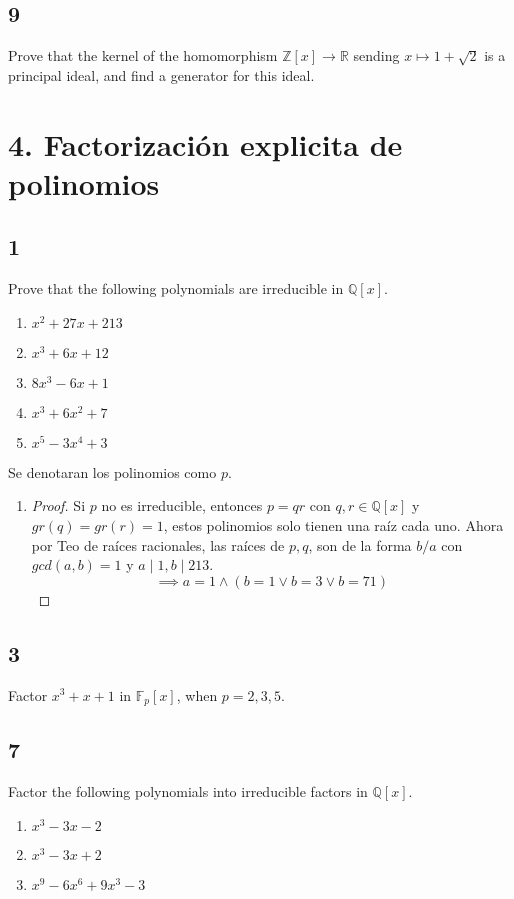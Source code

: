 \documentclass[11pt]{article}
\newcommand{\set}[1]{\mathbb{#1}}
\theoremstyle{definition}
\begin{document}
    \subsection{9}
    Prove that the kernel of the homomorphism $\set{Z}[x]\rightarrow \set{R}$ sending $x\mapsto 1+\sqrt{2}$ is a principal ideal, and find a generator for this ideal.

    \section{4. Factorización explicita de polinomios}
    \subsection{1}
    Prove that the following polynomials are irreducible in $\set{Q}[x]$.
    \begin{enumerate}[label=\textbf{(\alph*)}]
        \item $x^2+27x+213$

        \item $x^3+6x+12$

        \item $8x^3-6x+1$

        \item $x^3+6x^2+7$

        \item $x^5-3x^4+3$
    \end{enumerate}
    Se denotaran los polinomios como $p$.
    \begin{enumerate}[label=\textbf{(\alph*)}]
        \item \begin{proof}
            Si $p$ no es irreducible, entonces $p=qr$ con $q,r\in\set{Q}[x]$ y $gr(q)=gr(r)=1$, estos polinomios solo tienen una raíz cada uno. Ahora por Teo de raíces racionales, las raíces de $p,q$, son de la forma $b/a$ con $gcd(a,b)=1$ y $a\mid 1, b\mid 213$.
            \[\implies a=1\wedge(b=1\vee b=3\vee b=71)\]
        \end{proof}
    \end{enumerate}

    \subsection{3}
    Factor $x^3+x+1$ in $\set{F}_p[x]$, when $p=2,3,5$.

    \subsection{7}
    Factor the following polynomials into irreducible factors in $\set{Q}[x]$.
    \begin{enumerate}[label=\textbf{(\alph*)}]
        \item $x^3-3x-2$

        \item $x^3-3x+2$

        \item $x^9-6x^6+9x^3-3$
    \end{enumerate}
    
\end{document}
